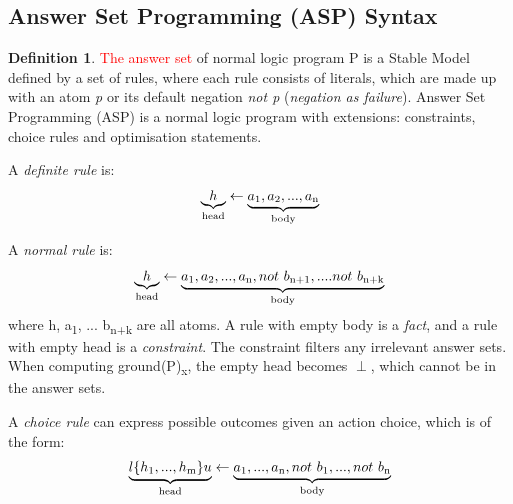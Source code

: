 \documentclass[11pt,twoside]{report}
\theoremstyle{plain}
\theoremstyle{definition}
\newtheorem{defn}[thm]{Definition} %
\begin{document}
\subsection{Answer Set Programming (ASP) Syntax}

\begin{defn}
\textcolor{red}{The answer set} of normal logic program P is a Stable Model defined by a set of rules, where each rule consists of literals, which are made up with an atom \textit{p} or its default negation \textit{not p} (\textit{negation as failure}). Answer Set Programming (ASP) is a normal logic program with extensions: constraints, choice rules and optimisation statements.
\end{defn}

A \textit{definite rule} is: 
\begin{equation}
\begin{split}
\underbrace{h}_\text{head} \leftarrow\underbrace{ a\textsubscript{1}, a\textsubscript{2}, ..., a\textsubscript{n}}_\text{body}
\end{split}
\label{asp_definite_rule}
\end{equation}

A \textit{normal rule} is: 
\begin{equation}
\begin{split}
\underbrace{h}_\text{head} \leftarrow\underbrace{ a\textsubscript{1}, a\textsubscript{2}, ..., a\textsubscript{n}, not \ b\textsubscript{n+1}, ....not \ b\textsubscript{n+k}}_\text{body}
\end{split}
\label{asp_normal_rule}
\end{equation}
where h, a\textsubscript{1}, ... b\textsubscript{n+k} are all atoms.
A rule with empty body is a \textit{fact}, and a rule with empty head is a  \textit{constraint}.
The constraint filters any irrelevant answer sets. When computing ground(P)\textsubscript{x}, the empty head becomes $\perp$, which cannot be in the answer sets.

A \textit{choice rule} can express possible outcomes given an action choice, which is of the form:
\begin{equation}
\begin{split}
\underbrace{l\{h\textsubscript{1},...,h\textsubscript{m}\}u}_\text{head} \leftarrow \underbrace{a\textsubscript{1}, ..., a\textsubscript{n}, not\ b\textsubscript{1}, ..., not\ b\textsubscript{n}}_\text{body}
\end{split}
\label{asp_choice_rule}
\end{equation}
\end{document}
